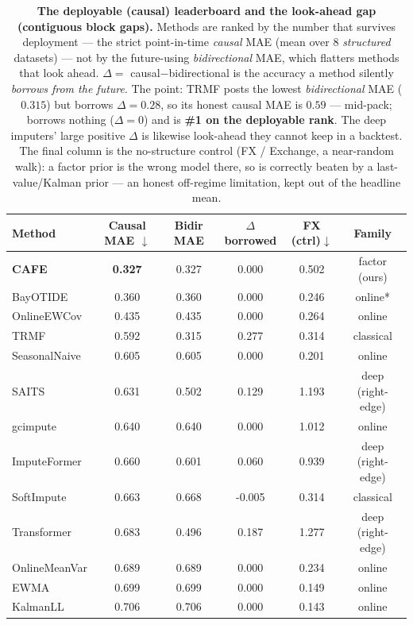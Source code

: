 \begin{table}[tbp]\centering\small
\setlength{\tabcolsep}{4pt}
\caption{\textbf{The deployable (causal) leaderboard and the look-ahead gap (contiguous block gaps).} Methods are ranked by the number that survives deployment --- the strict point-in-time \emph{causal} MAE (mean over 8 \emph{structured} datasets) --- not by the future-using \emph{bidirectional} MAE, which flatters methods that look ahead. $\Delta=$ causal$-$bidirectional is the accuracy a method silently \emph{borrows from the future}. The point: TRMF posts the lowest \emph{bidirectional} MAE ($0.315$) but borrows $\Delta\!=\!0.28$, so its honest causal MAE is $0.59$ --- mid-pack; \cafe{} borrows nothing ($\Delta=0$) and is \textbf{\#1 on the deployable rank}. The deep imputers' large positive $\Delta$ is likewise look-ahead they cannot keep in a backtest. The final column is the no-structure control (FX / Exchange, a near-random walk): a factor prior is the wrong model there, so \cafe{} is correctly beaten by a last-value/Kalman prior --- an honest off-regime limitation, kept out of the headline mean.}
\label{tab:bidirrace}
\begin{tabular}{@{}lccccc@{}}
\toprule
Method & Causal MAE $\downarrow$ & Bidir MAE & $\Delta$ borrowed & FX (ctrl)$\downarrow$ & Family \\
\midrule
\textbf{CAFE} & \textbf{0.327} & 0.327 & 0.000 & 0.502 & factor (ours) \\
BayOTIDE & 0.360 & 0.360 & 0.000 & 0.246 & online* \\
OnlineEWCov & 0.435 & 0.435 & 0.000 & 0.264 & online \\
TRMF & 0.592 & 0.315 & 0.277 & 0.314 & classical \\
SeasonalNaive & 0.605 & 0.605 & 0.000 & 0.201 & online \\
SAITS & 0.631 & 0.502 & 0.129 & 1.193 & deep (right-edge) \\
gcimpute & 0.640 & 0.640 & 0.000 & 1.012 & online \\
ImputeFormer & 0.660 & 0.601 & 0.060 & 0.939 & deep (right-edge) \\
SoftImpute & 0.663 & 0.668 & -0.005 & 0.314 & classical \\
Transformer & 0.683 & 0.496 & 0.187 & 1.277 & deep (right-edge) \\
OnlineMeanVar & 0.689 & 0.689 & 0.000 & 0.234 & online \\
EWMA & 0.699 & 0.699 & 0.000 & 0.149 & online \\
KalmanLL & 0.706 & 0.706 & 0.000 & 0.143 & online \\

\end{tabular}
\end{table}
